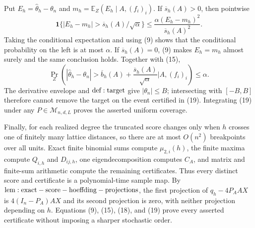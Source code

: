 Put \(E_h=\widehat\theta_h-\theta_n\) and \(m_h=\mathbb E_Z(E_h\mid A,(f_i)_i)\).  If \(\overline s_h(A)>0\), then pointwise
\[
 \mathbf1\{|E_h-m_h|>\overline s_h(A)/\sqrt\alpha\}
 \leq\frac{\alpha(E_h-m_h)^2}{\overline s_h(A)^2}.
\]
Taking the conditional expectation and using (9) shows that the conditional probability on the left is at most \(\alpha\).  If \(\overline s_h(A)=0\), (9) makes \(E_h=m_h\) almost surely and the same conclusion holds.  Together with (15),
\[
 \Pr_Z\!\left(
 |\widehat\theta_h-\theta_n|>
 \overline b_h(A)+\frac{\overline s_h(A)}{\sqrt\alpha}
 \mathrel{\Big|}A,(f_i)_i\right)\leq\alpha.
\tag{19}
\]
The derivative envelope and \({\rm def:target}\) give \(|\theta_n|\leq B\); intersecting with \([-B,B]\) therefore cannot remove the target on the event certified in (19).  Integrating (19) under any \(P\in\mathcal M_{n,d,L}\) proves the asserted uniform coverage.

Finally, for each realized degree the truncated score changes only when \(h\) crosses one of finitely many lattice distances, so there are at most \(O(n^2)\) breakpoints over all units.  Exact finite binomial sums compute \(\mu_{2,i}(h)\), the finite maxima compute \(Q_{i,h}\) and \(D_{ij,h}\), one eigendecomposition computes \(C_A\), and matrix and finite-sum arithmetic compute the remaining certificates.  Thus every distinct score and certificate is a polynomial-time sample map.  By \({\rm lem:exact-score-hoeffding-projections}\), the first projection of \(q_h-4P_AAX\) is \(4(I_n-P_A)AX\) and its second projection is zero, with neither projection depending on \(h\).  Equations (9), (15), (18), and (19) prove every asserted certificate without imposing a sharper stochastic order.